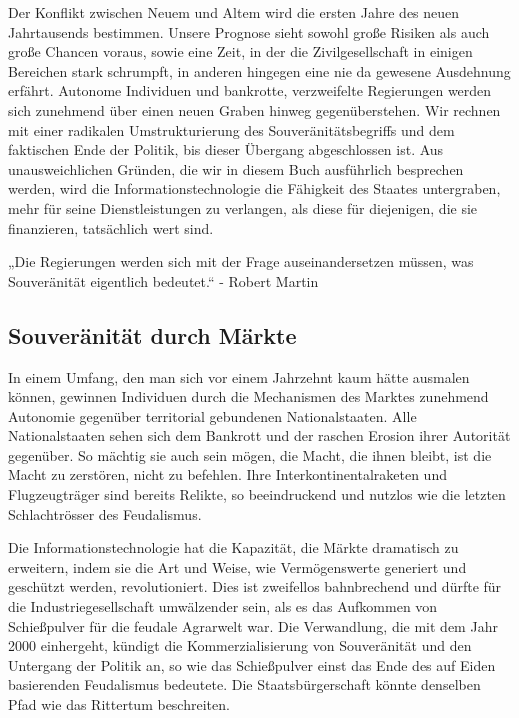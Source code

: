 \documentclass[
  a5paper,
  smalldemyvopaper,10pt,twoside,onecolumn,openright,extrafontsizes,hidelinks]{memoir}
\renewenvironment{quote}%
               {\list{}{\rightmargin=.6cm\leftmargin=.6cm}%
                \itshape \item[]}%
               {\endlist}
\begin{document}
Der Konflikt zwischen Neuem und Altem wird die ersten Jahre des neuen
Jahrtausends bestimmen. Unsere Prognose sieht sowohl große Risiken als
auch große Chancen voraus, sowie eine Zeit, in der die Zivilgesellschaft
in einigen Bereichen stark schrumpft, in anderen hingegen eine nie da
gewesene Ausdehnung erfährt. Autonome Individuen und bankrotte,
verzweifelte Regierungen werden sich zunehmend über einen neuen Graben
hinweg gegenüberstehen. Wir rechnen mit einer radikalen Umstrukturierung
des Souveränitätsbegriffs und dem faktischen Ende der Politik, bis
dieser Übergang abgeschlossen ist. Aus unausweichlichen Gründen, die wir
in diesem Buch ausführlich besprechen werden, wird die
Informationstechnologie die Fähigkeit des Staates untergraben, mehr für
seine Dienstleistungen zu verlangen, als diese für diejenigen, die sie
finanzieren, tatsächlich wert sind.

\begin{quote}
„Die Regierungen werden sich mit der Frage auseinandersetzen müssen, was
Souveränität eigentlich bedeutet.`` - Robert Martin
\end{quote}

\subsection{Souveränität durch
Märkte}\label{souveruxe4nituxe4t-durch-muxe4rkte}

In einem Umfang, den man sich vor einem Jahrzehnt kaum hätte ausmalen
können, gewinnen Individuen durch die Mechanismen des Marktes zunehmend
Autonomie gegenüber territorial gebundenen Nationalstaaten. Alle
Nationalstaaten sehen sich dem Bankrott und der raschen Erosion ihrer
Autorität gegenüber. So mächtig sie auch sein mögen, die Macht, die
ihnen bleibt, ist die Macht zu zerstören, nicht zu befehlen. Ihre
Interkontinentalraketen und Flugzeugträger sind bereits Relikte, so
beeindruckend und nutzlos wie die letzten Schlachtrösser des
Feudalismus.

Die Informationstechnologie hat die Kapazität, die Märkte dramatisch zu
erweitern, indem sie die Art und Weise, wie Vermögenswerte generiert und
geschützt werden, revolutioniert. Dies ist zweifellos bahnbrechend und
dürfte für die Industriegesellschaft umwälzender sein, als es das
Aufkommen von Schießpulver für die feudale Agrarwelt war. Die
Verwandlung, die mit dem Jahr 2000 einhergeht, kündigt die
Kommerzialisierung von Souveränität und den Untergang der Politik an, so
wie das Schießpulver einst das Ende des auf Eiden basierenden
Feudalismus bedeutete. Die Staatsbürgerschaft könnte denselben Pfad wie
das Rittertum beschreiten.
\end{document}

